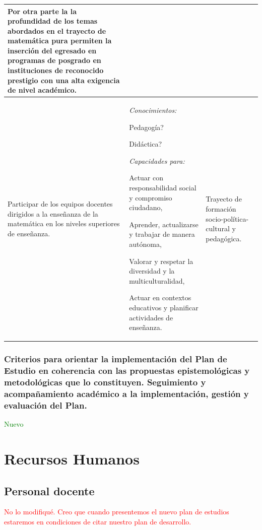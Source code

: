 \documentclass[a4paper, 12pt]{article}
\begin{document}
\begin{center}
\begin{tabularx}{1.0\textwidth}{|>{\raggedright\arraybackslash}X |
>{\raggedright\arraybackslash}X |
>{\raggedright\arraybackslash}X |
}
  Por otra parte la la profundidad de los temas abordados en el trayecto de matemática pura permiten la inserción del egresado en programas de posgrado en instituciones de reconocido prestigio con una alta exigencia de nivel académico.  \\ \hline

  Participar de los equipos docentes dirigidos a la enseñanza de la matemática en los niveles superiores de enseñanza.
  
  & 
     \emph{Conocimientos:}
   
   Pedagogía?
   
   Didáctica? 
   
   
   
   
   
   \emph{Capacidades para:}
  
   Actuar con responsabilidad social y compromiso ciudadano,
   
 Aprender, actualizarse y trabajar de manera autónoma,
 

 Valorar y respetar la diversidad y la multiculturalidad,
 
 
 Actuar en contextos educativos y planificar actividades de enseñanza.

  
  
  &  Trayecto de formación socio-política-cultural y pedagógica.\\ \hline
\end{tabularx}
\end{center}
\normalsize


\subsubsection{Criterios para orientar la implementación del Plan de Estudio en coherencia con las propuestas epistemológicas y metodológicas que lo constituyen. Seguimiento y acompañamiento académico a la implementación, gestión y evaluación del Plan.
} \textcolor{green}{Nuevo}


\section{Recursos Humanos}


\subsection{Personal docente}

\textcolor{red}{No lo modifiqué. Creo que cuando presentemos el nuevo plan de estudios estaremos en condiciones de citar nuestro plan de desarrollo.}
\end{document}
